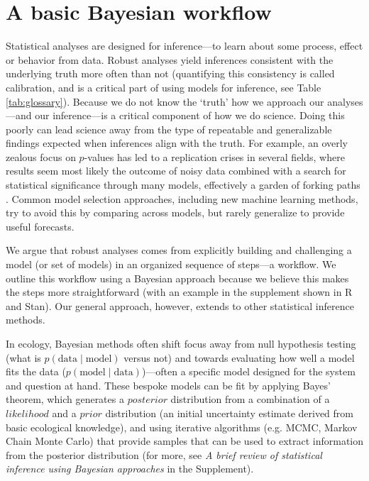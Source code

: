 \documentclass[11pt]{article}
\begin{document}
\section*{A basic Bayesian workflow}
Statistical analyses are designed for inference---to learn about some process, effect or behavior from data. Robust analyses yield inferences consistent with the underlying truth more often than not (quantifying this consistency is called calibration, and is a critical part of using models for inference, see Table \ref{tab:glossary}). Because we do not know the `truth' how we approach our analyses---and our inference---is a critical component of how we do science. Doing this poorly can lead science away from the type of repeatable and generalizable findings expected when inferences align with the truth. For example, an overly zealous focus on $p$-values has led to a replication crises in several fields, where results seem most likely the outcome of noisy data combined with a search for statistical significance through many models, effectively a garden of forking paths \citep{halsey2015,loken2017}. Common model selection approaches, including new machine learning methods, try to avoid this by comparing across models, but rarely generalize to provide useful forecasts. 

We argue that robust analyses comes from explicitly building and challenging a model (or set of models) in an organized sequence of steps---a workflow. We outline this workflow using a Bayesian approach because we believe this makes the steps more straightforward (with an example in the supplement shown in \textsf{R} and \textsf{Stan}). Our general approach, however, extends to other statistical inference methods. 

In ecology, Bayesian methods often shift focus away from null hypothesis testing (what is $p(\mathrm{data} \mid \mathrm{model})$ versus not) and towards evaluating how well a model fits the data ($p(\mathrm{model} \mid \mathrm{data})$)---often a specific model designed for the system and question at hand. These bespoke models can be fit by applying Bayes' theorem, which generates a $posterior$ distribution from a combination of a $likelihood$ and a $prior$ distribution (an initial uncertainty estimate derived from basic ecological knowledge), and using iterative algorithms (e.g. MCMC, Markov Chain Monte Carlo) that provide samples that can be used to extract information from the posterior distribution (for more, see \emph{A brief review of statistical inference using Bayesian approaches} in the Supplement).
\end{document}
